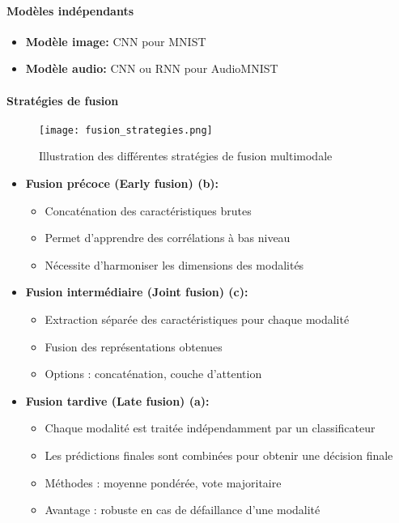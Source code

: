 \paragraph{Modèles indépendants}
\begin{itemize}
    \item \textbf{Modèle image:} CNN pour MNIST
    \item \textbf{Modèle audio:} CNN ou RNN pour AudioMNIST
\end{itemize}
\newpage
\paragraph{Stratégies de fusion}

\begin{figure}[H]
    \centering
    \texttt{[image: fusion\_strategies.png]}
    \caption{Illustration des différentes stratégies de fusion multimodale}
    \label{fig:fusion}
\end{figure}

\begin{itemize}
    \item \textbf{Fusion précoce (Early fusion) (b):}
    \begin{itemize}
        \item Concaténation des caractéristiques brutes
        \item Permet d'apprendre des corrélations à bas niveau
        \item Nécessite d'harmoniser les dimensions des modalités
    \end{itemize}
    
    \item \textbf{Fusion intermédiaire (Joint fusion) (c):}
    \begin{itemize}
        \item Extraction séparée des caractéristiques pour chaque modalité
        \item Fusion des représentations obtenues
        \item Options : concaténation, couche d'attention
    \end{itemize}
    
    \item \textbf{Fusion tardive (Late fusion) (a):}
    \begin{itemize}
        \item Chaque modalité est traitée indépendamment par un classificateur
        \item Les prédictions finales sont combinées pour obtenir une décision finale
        \item Méthodes : moyenne pondérée, vote majoritaire
        \item Avantage : robuste en cas de défaillance d’une modalité
    \end{itemize}    
\end{itemize}

